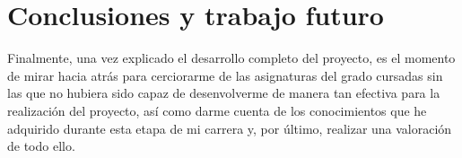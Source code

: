 \chapter[Capítulo 7. Conclusiones y trabajo futuro]{Conclusiones y trabajo futuro}

Finalmente, una vez explicado el desarrollo completo del proyecto, es el momento de mirar hacia atrás para cerciorarme de las asignaturas del grado cursadas sin las que no hubiera sido capaz de desenvolverme de manera tan efectiva para la realización del proyecto, así como darme cuenta de los conocimientos que he adquirido durante esta etapa de mi carrera y, por último, realizar una valoración de todo ello.


\newpage









